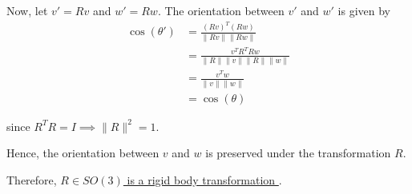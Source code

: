 Now, let \(v' = R v\) and \(w' = R w\). The orientation between \(v'\) and \(w'\) is given by
\begin{align*}
    \cos(\theta')
     & = \frac{{(R v)}^{T} (R w)}{\lVert R v \rVert \lVert R w \rVert}
    \\ & = \frac{v^{T} R^{T} R w}{\lVert R \rVert \lVert v \rVert \lVert R \rVert \lVert w \rVert}
    \\ & = \frac{v^{T} w}{\lVert v \rVert \lVert w \rVert}
    \\ & = \cos(\theta)
\end{align*}

since \(R^{T} R = I \implies \lVert R \rVert^2 = 1\).

Hence, the orientation between \(v\) and \(w\) is preserved under the transformation \(R\).

Therefore, \underline{ \(R \in S O(3)\) is a rigid body transformation }.
